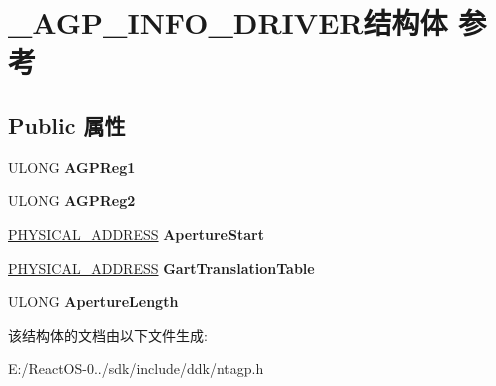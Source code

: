 \hypertarget{struct___a_g_p___i_n_f_o___d_r_i_v_e_r}{}\section{\+\_\+\+A\+G\+P\+\_\+\+I\+N\+F\+O\+\_\+\+D\+R\+I\+V\+E\+R结构体 参考}
\label{struct___a_g_p___i_n_f_o___d_r_i_v_e_r}
\subsection*{Public 属性}
\begin{DoxyCompactItemize}
\item 
\mbox{\label{struct___a_g_p___i_n_f_o___d_r_i_v_e_r_a7d135a73af6aa77023300e1a161e1ac2}} 
U\+L\+O\+NG {\bfseries A\+G\+P\+Reg1}
\item 
\mbox{\label{struct___a_g_p___i_n_f_o___d_r_i_v_e_r_a968e1687d661b8b60aa8f7fa6546527a}} 
U\+L\+O\+NG {\bfseries A\+G\+P\+Reg2}
\item 
\mbox{\label{struct___a_g_p___i_n_f_o___d_r_i_v_e_r_af0ee5878cc1e44f5cde03848f6a306da}} 
\hyperlink{union___l_a_r_g_e___i_n_t_e_g_e_r}{P\+H\+Y\+S\+I\+C\+A\+L\+\_\+\+A\+D\+D\+R\+E\+SS} {\bfseries Aperture\+Start}
\item 
\mbox{\label{struct___a_g_p___i_n_f_o___d_r_i_v_e_r_a09cc5f9cb0c5d18ef89fb504c5f57a86}} 
\hyperlink{union___l_a_r_g_e___i_n_t_e_g_e_r}{P\+H\+Y\+S\+I\+C\+A\+L\+\_\+\+A\+D\+D\+R\+E\+SS} {\bfseries Gart\+Translation\+Table}
\item 
\mbox{\label{struct___a_g_p___i_n_f_o___d_r_i_v_e_r_a0e5808e6946962bbf6c6f3b70d2158f3}} 
U\+L\+O\+NG {\bfseries Aperture\+Length}
\end{DoxyCompactItemize}


该结构体的文档由以下文件生成\+:\begin{DoxyCompactItemize}
\item 
E\+:/\+React\+O\+S-\/0../sdk/include/ddk/ntagp.\+h\end{DoxyCompactItemize}
